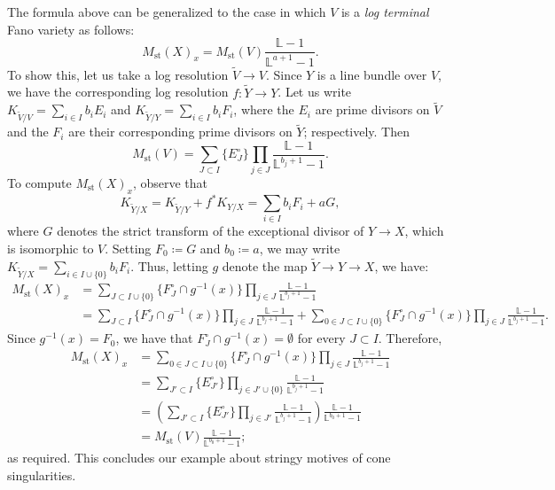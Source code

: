 \documentclass[12pt]{amsart}
\theoremstyle{plain}   %
\theoremstyle{definition}    %
\theoremstyle{remark}    %
\numberwithin{equation}{theorem}
\newcommand{\bL}{\mathbb{L}}
\begin{document}
\begin{example}[Cones]
The formula above can be generalized to the case in which $V$ is a \emph{log terminal} Fano variety as follows:
\[
 M_{\mathrm{st}}(X)_x = M_{\mathrm{st}}(V)\frac{\bL-1}{\bL^{a+1} -1 }. 
\]
To show this, let us take a log resolution $\tilde{V}\to V$. Since $Y$ is a line bundle over $V$, we have the corresponding log resolution $f\colon\tilde{Y} \to Y $. Let us write $K_{\tilde{V}/V} = \sum _{i\in I} b_i E_i$ and  $K_{\tilde{Y}/Y} = \sum _{i\in I} b_i F_i$, where the $E_i$ are prime divisors on $\tilde{V}$ and the $F_i$ are their corresponding prime divisors on $\tilde{Y}$; respectively. Then 
\[
M_{\mathrm{st}}(V)=\sum_{J\subset I} \{E_J^\circ\} \prod_{j \in J} \frac{\bL-1}{\bL^{b_j+1}-1}. 
\]
To compute $M_{\mathrm{st}}(X)_x$, observe that
\[K_{\tilde{Y}/X}
= K_{\tilde{Y}/Y} +  f^* K_{Y/X} = \sum_{i\in I} b_i F_i + a G,
\]
where $G$ denotes the strict transform of the exceptional divisor of $Y\to X$, which is isomorphic to $V$. Setting $F_0 \coloneqq G$ and $b_0 \coloneqq a$, we may write $K_{\tilde{Y}/X} = \sum _{i\in I\cup \{0\}} b_i F_i $. Thus, letting $g$ denote the map $\tilde{Y} \to Y \to X$, we have:
\begin{align*}
    M_{\mathrm{st}}(X)_x 
    &= \sum_{J\subset I\cup \{0\}} \big\{F_J^\circ \cap g^{-1}(x)\big\} \prod_{j\in J}\frac{\bL-1}{\bL^{b_j+1}-1} \\
    &= \sum_{J\subset I} \big\{F_J^\circ \cap g^{-1}(x)\big\} \prod_{j\in J}\frac{\bL-1}{\bL^{b_j+1}-1} 
    + \sum_{0\in J\subset I\cup \{0\}} \big\{F_J^\circ \cap g^{-1}(x)\big\} \prod_{j\in J}\frac{\bL-1}{\bL^{b_j+1}-1} . 
\end{align*}
Since $g^{-1}(x)=F_0$, we have that $F_J^\circ \cap g^{-1}(x) =\emptyset$ for every $J\subset I$. Therefore,
\begin{align*}
    M_{{\mathrm{st}}}(X)_x 
    &=   \sum_{0\in J\subset I\cup \{0\}} \big\{F_J^\circ \cap g^{-1}(x)\big\} \prod_{j\in J}\frac{\bL-1}{\bL^{b_j+1}-1} \\
    &=  \sum_{J'\subset I} \{E_{J'}^\circ \} \prod_{j\in J'\cup\{0\}}\frac{\bL-1}{\bL^{b_j+1}-1} \\
    &=  \left(\sum_{J'\subset I} \{E_{J'}^\circ \} \prod_{j\in J'}\frac{\bL-1}{\bL^{b_j+1}-1}\right) \frac{\bL-1}{\bL^{b_0+1}-1}\\
    & = M_{\mathrm{st}}(V)\frac{\bL-1}{\bL^{b_0+1}-1};
\end{align*}
as required. This concludes our example about stringy motives of cone singularities.
\end{example}
\end{document}
